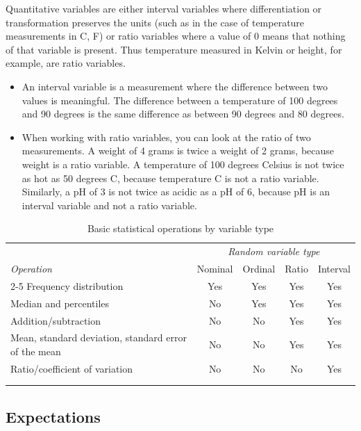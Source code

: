Quantitative variables are either interval variables where differentiation or transformation preserves the units (such as in the case of temperature measurements in C, F) or ratio variables where a value of 0 means that nothing of that variable is present. Thus temperature measured in Kelvin or height, for example, are ratio variables.

\begin{itemize}
\item An interval variable is a measurement where the difference between two values is meaningful. The difference between a temperature of 100 degrees and 90 degrees is the same difference as between 90 degrees and 80 degrees. 
\item When working with ratio variables, you can look at the ratio of two measurements. A weight of 4 grams is twice a weight of 2 grams, because weight is a ratio variable. A temperature of 100 degrees Celsius is not twice as hot as 50 degrees C, because temperature C is not a ratio variable. Similarly, a pH of 3 is not twice as acidic as a pH of 6, because pH is an interval variable and not a ratio variable. 
\end{itemize}

\begin{table}[htp] 
\centering
\caption{Basic statistical operations by variable type}
\footnotesize
\begin{tabular}{lcccc}\label{tbl_Vars}
\\ \hline
\hline
&\multicolumn{4}{c}{\emph{Random variable type}}\\
\emph{Operation}&Nominal&Ordinal&Ratio&Interval\\
\cline{2-5}
Frequency distribution&Yes&Yes&Yes&Yes\\
Median and percentiles&No&Yes&Yes&Yes\\
Addition/subtraction&No&No&Yes&Yes\\
Mean, standard deviation, standard error of the mean&No&No&Yes&Yes\\
Ratio/coefficient of variation&No&No&No&Yes\\
\hline
\hline \\
\normalsize
\end{tabular}
\end{table}


\subsection{Expectations}
